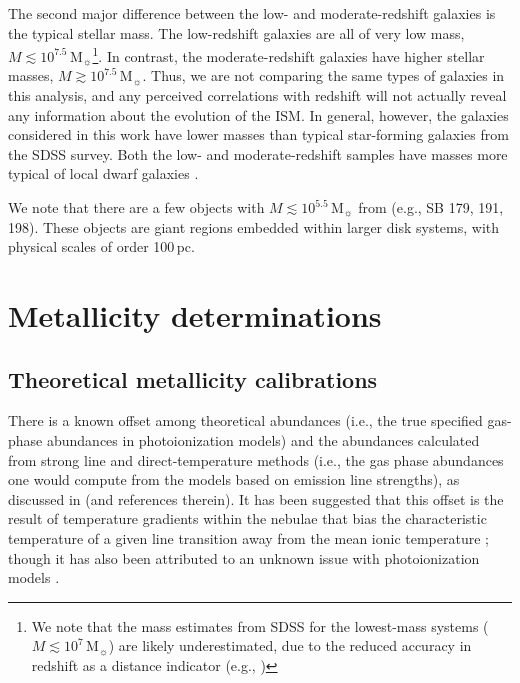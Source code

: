 \documentclass[preprint2]{aastex62}
\newcommand{\hii}{\ion{H}{2}}
\newcommand\Msun{\ensuremath{\mathrm{M_{\sun}}}\xspace}
\begin{document}
The second major difference between the low- and moderate-redshift galaxies is the typical stellar mass. The low-redshift galaxies are all of very low mass, $M \lesssim 10^{7.5}$\,\Msun\footnote{We note that the mass estimates from SDSS for the lowest-mass systems ($M \lesssim 10^{7}$\,\Msun) are likely underestimated, due to the reduced accuracy in redshift as a distance indicator (e.g., \citealt{Mamon+2019})}. In contrast, the moderate-redshift galaxies have higher stellar masses, $M \gtrsim 10^{7.5}$\,\Msun. Thus, we are not comparing the same types of galaxies in this analysis, and any perceived correlations with redshift will not actually reveal any information about the evolution of the ISM. In general, however, the galaxies considered in this work have lower masses than typical star-forming galaxies from the SDSS survey. Both the low- and moderate-redshift samples have masses more typical of local dwarf galaxies \citep[e.g.,][]{Lee+2006, Berg+2012}.

We note that there are a few objects with $M \lesssim 10^{5.5}$\,\Msun from \citet{Senchyna+2017} (e.g., SB 179, 191, 198). These objects are giant \hii{} regions embedded within larger disk systems, with physical scales of order 100\,pc.


\section{Metallicity determinations}\label{sec:Z}

\subsection{Theoretical metallicity calibrations}\label{sec:Z:corr}

There is a known offset among theoretical abundances (i.e., the true specified gas-phase abundances in photoionization models) and the abundances calculated from strong line and direct-temperature methods (i.e., the gas phase abundances one would compute from the models based on emission line strengths), as discussed in \citealt{Stasinska+2005, Kewley+2008} (and references therein). It has been suggested that this offset is the result of temperature gradients within the nebulae that bias the characteristic temperature of a given line transition away from the mean ionic temperature \citep[e.g.,][]{Stasinska+2005, Bresolin+2007, Kewley+2008}; though it has also been attributed to an unknown issue with photoionization models \citep[e.g.,][]{Kennicutt+2003}.
\end{document}
